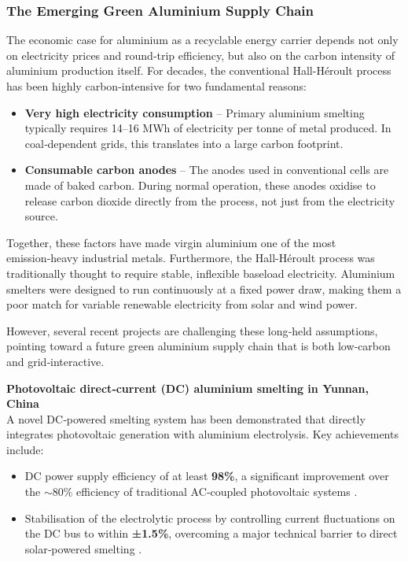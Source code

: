 \documentclass[12pt]{article}
\begin{document}
\subsubsection{The Emerging Green Aluminium Supply Chain}

The economic case for aluminium as a recyclable energy carrier depends not only on electricity prices and round‑trip efficiency, but also on the carbon intensity of aluminium production itself. For decades, the conventional Hall-Héroult process has been highly carbon‑intensive for two fundamental reasons:

\begin{itemize}
\item \textbf{Very high electricity consumption} – Primary aluminium smelting typically requires 14–16 MWh of electricity per tonne of metal produced. In coal‑dependent grids, this translates into a large carbon footprint.
\item \textbf{Consumable carbon anodes} – The anodes used in conventional cells are made of baked carbon. During normal operation, these anodes oxidise to release carbon dioxide directly from the process, not just from the electricity source.
\end{itemize}

Together, these factors have made virgin aluminium one of the most emission‑heavy industrial metals. Furthermore, the Hall-Héroult process was traditionally thought to require stable, inflexible baseload electricity. Aluminium smelters were designed to run continuously at a fixed power draw, making them a poor match for variable renewable electricity from solar and wind power.

However, several recent projects are challenging these long‑held assumptions, pointing toward a future green aluminium supply chain that is both low‑carbon and grid‑interactive.

\textbf{Photovoltaic direct‑current (DC) aluminium smelting in Yunnan, China} \\
A novel DC‑powered smelting system has been demonstrated that directly integrates photovoltaic generation with aluminium electrolysis. Key achievements include:

\begin{itemize}
\item DC power supply efficiency of at least \textbf{98\%}, a significant improvement over the \(\sim80\%\) efficiency of traditional AC‑coupled photovoltaic systems \cite{dc-aluminium-basic}.
\item Stabilisation of the electrolytic process by controlling current fluctuations on the DC bus to within \textbf{±1.5\%}, overcoming a major technical barrier to direct solar‑powered smelting \cite{dc-aluminium-basic}.
\end{itemize}
\end{document}
